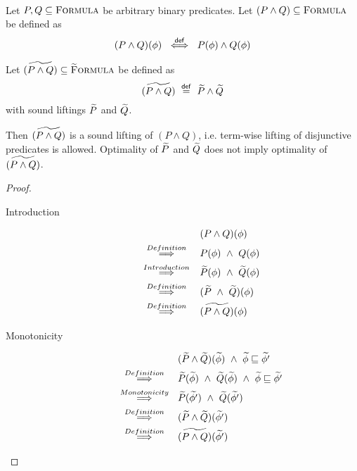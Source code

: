 \begin{lemma}~\\
    Let $P, Q \subseteq \textup{\textsc{Formula}}$ be arbitrary binary predicates.
    Let $(P \wedge Q) \subseteq \textup{\textsc{Formula}}$ be defined as
    \begin{displaymath}
    (P \wedge Q)(\phi) ~\overset{\textup{\textmd{\textsf{def}}}}{\iff}~ P(\phi) \wedge Q(\phi)
    \end{displaymath}
    
    Let $\widetilde{(P \wedge Q)} \subseteq \textup{\textsc{\ensuremath{\widetilde{\text{F}}}ormula}}$ be defined as
    \begin{displaymath}
    \widetilde{(P \wedge Q)} ~\overset{\textup{\textmd{\textsf{def}}}}{=}~ \widetilde{P} \wedge \widetilde{Q}
    \end{displaymath}
    with sound liftings $\widetilde{P}$ and $\widetilde{Q}$.
    
    Then $\widetilde{(P \wedge Q)}$ is a sound lifting of $(P \wedge Q)$, i.e. term-wise lifting of disjunctive predicates is allowed.
    Optimality of $\widetilde{P}$ and $\widetilde{Q}$ does not imply optimality of $\widetilde{(P \wedge Q)}$.
\end{lemma}
\begin{proof}
    \begin{description}
        \item[Introduction] 
        \begin{align*}
        &(P \wedge Q)(\phi)\\
        \overset{Definition}{~\quad\quad\implies\quad\quad~}
        &P(\phi) ~\wedge~ Q(\phi)\\
        \overset{Introduction}{~\quad\quad\implies\quad\quad~}
        &\widetilde{P}(\phi) ~\wedge~ \widetilde{Q}(\phi)\\
        \overset{Definition}{~\quad\quad\implies\quad\quad~}
        &(\widetilde{P} ~\wedge~ \widetilde{Q})(\phi)\\
        \overset{Definition}{~\quad\quad\implies\quad\quad~}
        &\widetilde{(P \wedge Q)}(\phi)\\
        \end{align*}
        
        \item[Monotonicity] 
        \begin{align*}
        &(\widetilde{P} \wedge \widetilde{Q})(\widetilde{\phi}) ~\wedge~ \widetilde{\phi} \sqsubseteq \widetilde{\phi'}\\
        \overset{Definition}{~\quad\quad\implies\quad\quad~}
        &\widetilde{P}(\widetilde{\phi}) ~\wedge~ \widetilde{Q}(\widetilde{\phi}) ~\wedge~ \widetilde{\phi} \sqsubseteq \widetilde{\phi'}\\
        \overset{Monotonicity}{~\quad\quad\implies\quad\quad~}
        &\widetilde{P}(\widetilde{\phi'}) ~\wedge~ \widetilde{Q}(\widetilde{\phi'})\\
        \overset{Definition}{~\quad\quad\implies\quad\quad~}
        &(\widetilde{P} \wedge \widetilde{Q})(\widetilde{\phi'})\\
        \overset{Definition}{~\quad\quad\implies\quad\quad~}
        &\widetilde{(P \wedge Q)}(\widetilde{\phi'})\\
        \end{align*}
    \end{description}
\end{proof}

